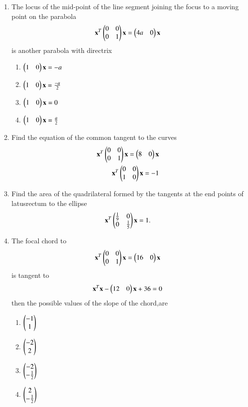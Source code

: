 \documentclass[journal,12pt,twocolumn]{IEEEtran}
\begin{document}
\begin{enumerate}[label=\arabic*]
\item The locus of the mid-point of the line segment joining the focus to a moving point on the 			parabola  
    \begin{align} 
    \mathbf {x}^T\begin{pmatrix}0 & 0 \\0 & 1\end{pmatrix}\mathbf {x}=\begin{pmatrix}4a&0\end{pmatrix}\mathbf{x}
    \end{align} is another parabola with directrix 
    \begin{enumerate}
    \item $\begin{pmatrix}1&0\end{pmatrix}\mathbf{x}=-a$
    \item $\begin{pmatrix}1&0\end{pmatrix}\mathbf{x}=\frac{-a}{2}$
    \item $\begin{pmatrix}1&0\end{pmatrix}\mathbf{x}=0$
    \item $\begin{pmatrix}1&0\end{pmatrix}\mathbf{x}=\frac{a}{2}$
    \end{enumerate}
\item Find the equation of the common tangent to the curves 
	\begin{align}
    \mathbf{x}^T \begin{pmatrix}0 & 0 \\0 & 1\end{pmatrix}\mathbf{x}=\begin{pmatrix}8&0\end{pmatrix}\mathbf{x}\\
    \mathbf{x}^T \begin{pmatrix}0 & 0 \\ 1& 0\end{pmatrix}\mathbf{x}=-1
    \end{align}
\item Find the area of the quadrilateral formed by the tangents at the end points of latusrectum to the ellipse
    \begin{align}
    \mathbf{x}^T \begin{pmatrix}\frac{1}{9} & 0 \\0 & \frac{1}{5}\end{pmatrix} \mathbf{x}=1.
    \end{align}
\item The focal chord to
    \begin{align}
    \mathbf{x}^T \begin{pmatrix}0 & 0 \\0 & 1\end{pmatrix}\mathbf{x}=\begin{pmatrix}16&0\end{pmatrix}\mathbf{x}
    \end{align}
    is tangent to
    \begin{align}
    \mathbf {x}^T\mathbf{x}-\begin{pmatrix}12&0\end{pmatrix}\mathbf{x}+36=0
    \end{align} then the possible values of the slope of the chord,are 
    \begin{enumerate}
    \item $\begin{pmatrix}-1\\1\end{pmatrix}$
    \item $\begin{pmatrix}-2\\2\end{pmatrix}$
    \item $\begin{pmatrix}-2\\ -\frac{1}{2}\end{pmatrix}$
    \item $\begin{pmatrix}2\\ -\frac{1}{2}\end{pmatrix}$

\end{enumerate}
\end{enumerate}
\end{document}
